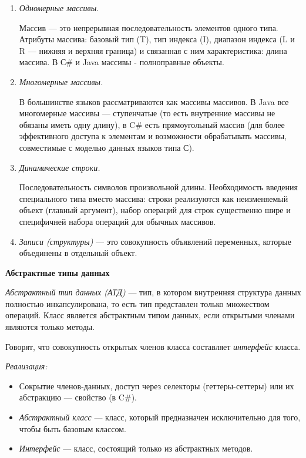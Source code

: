 \begin{enumerate}
    \item \textit{Одномерные массивы.}

    Массив — это непрерывная последовательность элементов одного типа.
    Атрибуты массива: базовый тип (T), тип индекса (I), диапазон индекса (L и R — нижняя и верхняя граница) и связанная с ним характеристика: длина массива.
    В С\# и Java массивы - полноправные объекты.
    \item \textit{Многомерные массивы.}

    В большинстве языков рассматриваются как массивы массивов.
    В Java все многомерные массивы --- ступенчатые (то есть внутренние массивы не обязаны иметь одну длину), в C\# есть прямоугольный массив (для более эффективного доступа к элементам и возможности обрабатывать массивы, совместимые с моделью данных языков типа С).
    \item \textit{Динамические строки.}

    Последовательность символов произвольной длины.
    Необходимость введения специального типа вместо массива: строки реализуются как неизменяемый объект (главный аргумент), набор операций для строк существенно шире и специфичней набора операций для обычных массивов.
    \item \textit{Записи (структуры)} --- это совокупность объявлений переменных, которые объединены в отдельный объект.
\end{enumerate}

\textbf{Абстрактные типы данных}

\textit{Абстрактный тип данных (АТД)} --- тип, в котором внутренняя структура данных полностью инкапсулирована, то есть тип представлен только множеством операций.
Класс является абстрактным типом данных, если открытыми членами являются только методы.

Говорят, что совокупность открытых членов класса составляет \textit{интерфейс} класса.

\textit{Реализация:}
\begin{itemize}
    \item Сокрытие членов-данных, доступ через селекторы (геттеры-сеттеры) или их абстракцию --- свойство (в C\#).
    \item \textit{Абстрактный класс} --- класс, который предназначен исключительно для того, чтобы быть базовым классом.
    \item \textit{Интерфейс} --- класс, состоящий только из абстрактных методов.
\end{itemize}

